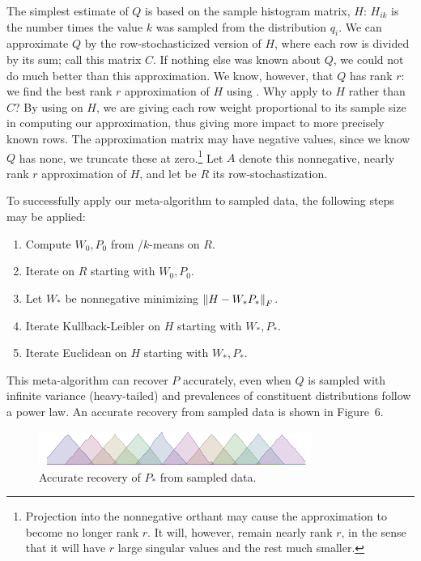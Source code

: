 \documentclass[conference]{IEEEtran}
\begin{document}
The simplest estimate of $Q$ is based on the sample histogram matrix, $H$:
$H_{ik}$ is the number times the value $k$ was sampled from the distribution $q_i$.
We can approximate $Q$ by the row-stochasticized version of $H$, where each row is divided by its sum;
call this matrix $C$.
If nothing else was known about $Q$, we could not do much better than this approximation.
We know, however, that $Q$ has rank $r$:
we find the best rank $r$ approximation of $H$ using .
Why apply  to $H$ rather than $C$?
By using  on $H$, we are giving each row weight proportional to its sample size in computing our approximation, thus giving more impact to more precisely known rows.
The  approximation matrix may have negative values, since we know $Q$ has none, we truncate these at zero.\footnote{Projection into the nonnegative orthant may cause the approximation to become no longer rank $r$. It will, however, remain nearly rank $r$, in the sense that it will have $r$ large singular values and the rest much smaller.}
Let $A$ denote this nonnegative, nearly rank $r$ approximation of $H$, and let be $R$ its row-stochastization.

To successfully apply our meta-algorithm to sampled data, the following steps may be applied:
\begin{enumerate}
  \item Compute $W_0,P_0$ from /$k$-means on $R$.
  \item Iterate  on $R$ starting with $W_0,P_0$.
  \item Let $W_*$ be nonnegative minimizing ${\lVert H - W_* P_*\rVert}_F$. 
  \item Iterate Kullback-Leibler on $H$ starting with $W_*,P_*$.
  \item Iterate Euclidean on $H$ starting with $W_*,P_*$.
\end{enumerate}
This meta-algorithm can recover $P$ accurately, even when $Q$ is sampled with infinite variance (heavy-tailed) and prevalences of constituent distributions follow a power law.
An accurate recovery from sampled data is shown in Figure~6.

\begin{figure}[t]
\begin{center}
\includegraphics[width=3.5in]{synth/S_nmf}
\end{center}
\vspace{-0.7em}
\caption{Accurate recovery of $P_*$ from sampled data.}
\vspace{-1em}
\end{figure}
\end{document}
